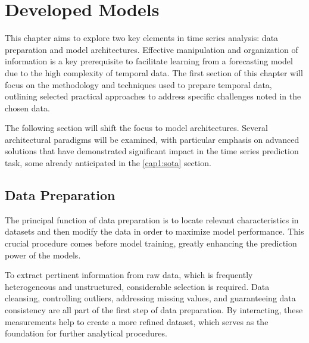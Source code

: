 \chapter{Developed Models}
\label{chap:Models}

This chapter aims to explore two key elements in time series analysis: data preparation and model architectures. Effective manipulation and organization of information is a key prerequisite to facilitate learning from a forecasting model due to the high complexity of temporal data. The first section of this chapter will focus on the methodology and techniques used to prepare temporal data, outlining selected practical approaches to address specific challenges noted in the chosen data.

The following section will shift the focus to model architectures. Several architectural paradigms will be examined, with particular emphasis on advanced solutions that have demonstrated significant impact in the time series prediction task, some already anticipated in the \ref{cap1:sota} section.

\section{Data Preparation}
\label{sec:DataPreparation}

The principal function of data preparation is to locate relevant characteristics in datasets and then modify the data in order to maximize model performance. This crucial procedure comes before model training, greatly enhancing the prediction power of the models.

To extract pertinent information from raw data, which is frequently heterogeneous and unstructured, considerable selection is required. Data cleansing, controlling outliers, addressing missing values, and guaranteeing data consistency are all part of the first step of data preparation. By interacting, these measurements help to create a more refined dataset, which serves as the foundation for further analytical procedures.

